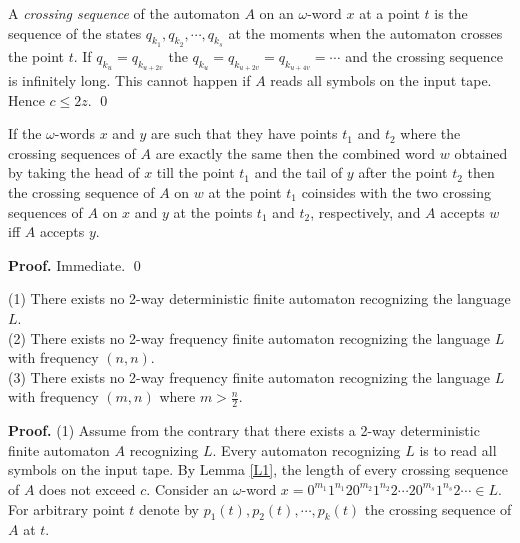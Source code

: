 \documentclass{llncs}
\begin{document}
A {\em crossing sequence} of the automaton $A$ on an $\omega $-word $x$  at a point $t$ is the sequence of the states $q_{k_1}, q_{k_2}, \cdots , q_{k_s}$ at the moments when the automaton crosses the point $t$. If $q_{k_u} = q_{k_{u+2v}}$ the $q_{k_u} = q_{k_{u+2v}} =  q_{k_{u+4v}} = \cdots$ and the crossing sequence is infinitely long. This cannot happen if $A$ reads all symbols on the input tape. Hence $c \leq 2z$. \qed


\begin{lemma}
\label{L2} 
If the $\omega $-words $x$ and $y$ are such that they have points $t_1$ and $t_2$ where the crossing sequences of $A$ are exactly the same then the combined word $w$ obtained by taking the head of $x$ till the point $t_1$ and the tail of $y$ after the point $t_2$ then the crossing sequence of $A$ on $w$ at the point $t_1$ coinsides with the two crossing sequences of $A$ on $x$ and $y$ at the points
$t_1$ and $t_2$, respectively, and $A$ accepts $w$ iff $A$ accepts $y$.
\end{lemma}

{\bf Proof.} Immediate. \qed

\bigskip

\begin{theorem}
(1) There exists no 2-way deterministic finite automaton recognizing  the language $L$.\\
(2) There exists no 2-way frequency finite automaton recognizing  the language $L$ with frequency $(n,n)$.\\
(3) There exists no 2-way frequency finite automaton recognizing  the language $L$ with frequency $(m,n)$ where $m > \frac{n}{2}$.
\end{theorem}

{\bf Proof.} (1)  Assume from the contrary that there exists a 2-way deterministic finite
automaton $A$ recognizing $L$. 
Every automaton recognizing $L$ is to read all symbols on the input tape. By Lemma \ref{L1}, the length of every crossing sequence of $A$ does not exceed $c$. 
Consider an $\omega $-word
$x = 0^{m_1}1^{n_1}20^{m_2}1^{n_2}2\cdots 20^{m_s}1^{n_s}2\cdots \in L$. 
For arbitrary point $t$  denote by $p_1(t), p_2(t), \cdots , p_k(t)$ the crossing sequence of  $A$ at $t$. 
\end{document}
